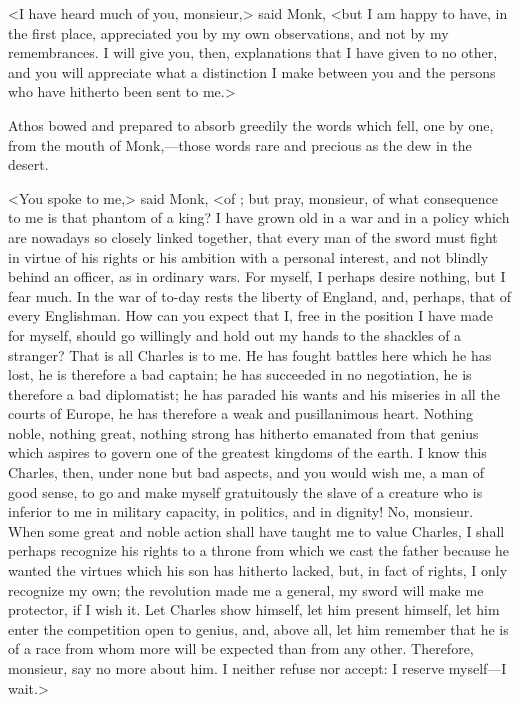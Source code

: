 <I have heard much of you, monsieur,> said Monk, <but I am happy to have, in the first place, appreciated you by my own observations, and not by my remembrances. I will give you, then, explanations that I have given to no other, and you will appreciate what a distinction I make between you and the persons who have hitherto been sent to me.>

Athos bowed and prepared to absorb greedily the words which fell, one by one, from the mouth of Monk,—those words rare and precious as the dew in the desert.

<You spoke to me,> said Monk, <of ; but pray, monsieur, of what consequence to me is that phantom of a king? I have grown old in a war and in a policy which are nowadays so closely linked together, that every man of the sword must fight in virtue of his rights or his ambition with a personal interest, and not blindly behind an officer, as in ordinary wars. For myself, I perhaps desire nothing, but I fear much. In the war of to-day rests the liberty of England, and, perhaps, that of every Englishman. How can you expect that I, free in the position I have made for myself, should go willingly and hold out my hands to the shackles of a stranger? That is all Charles is to me. He has fought battles here which he has lost, he is therefore a bad captain; he has succeeded in no negotiation, he is therefore a bad diplomatist; he has paraded his wants and his miseries in all the courts of Europe, he has therefore a weak and pusillanimous heart. Nothing noble, nothing great, nothing strong has hitherto emanated from that genius which aspires to govern one of the greatest kingdoms of the earth. I know this Charles, then, under none but bad aspects, and you would wish me, a man of good sense, to go and make myself gratuitously the slave of a creature who is inferior to me in military capacity, in politics, and in dignity! No, monsieur. When some great and noble action shall have taught me to value Charles, I shall perhaps recognize his rights to a throne from which we cast the father because he wanted the virtues which his son has hitherto lacked, but, in fact of rights, I only recognize my own; the revolution made me a general, my sword will make me protector, if I wish it. Let Charles show himself, let him present himself, let him enter the competition open to genius, and, above all, let him remember that he is of a race from whom more will be expected than from any other. Therefore, monsieur, say no more about him. I neither refuse nor accept: I reserve myself—I wait.>

